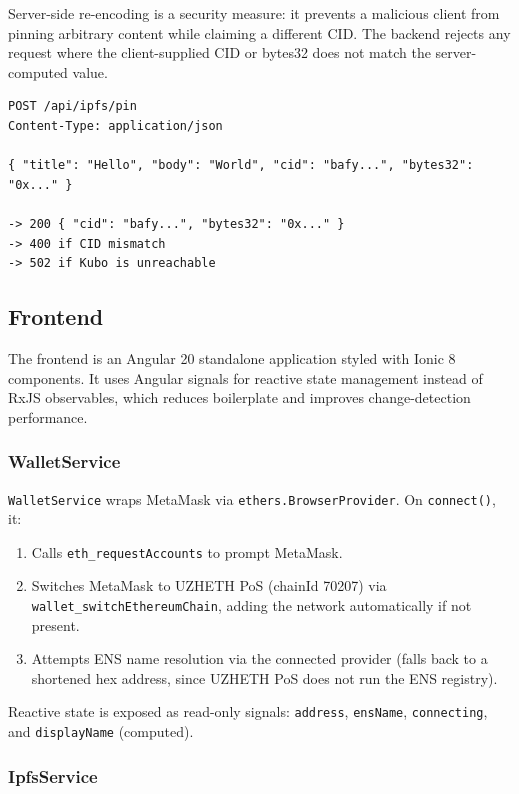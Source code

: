\documentclass[11pt]{article}
\begin{document}
Server-side re-encoding is a security measure: it prevents a malicious client from pinning arbitrary content while claiming a different CID. The backend rejects any request where the client-supplied CID or bytes32 does not match the server-computed value.

\begin{lstlisting}[style=command]
POST /api/ipfs/pin
Content-Type: application/json

{ "title": "Hello", "body": "World", "cid": "bafy...", "bytes32": "0x..." }

-> 200 { "cid": "bafy...", "bytes32": "0x..." }
-> 400 if CID mismatch
-> 502 if Kubo is unreachable
\end{lstlisting}

\subsection{Frontend}

The frontend is an Angular 20 standalone application styled with Ionic 8 components. It uses Angular signals for reactive state management instead of RxJS observables, which reduces boilerplate and improves change-detection performance.

\subsubsection{WalletService}

\texttt{WalletService} wraps MetaMask via \texttt{ethers.BrowserProvider}. On \texttt{connect()}, it:
\begin{enumerate}
  \item Calls \texttt{eth\_requestAccounts} to prompt MetaMask.
  \item Switches MetaMask to UZHETH PoS (chainId 70207) via \texttt{wallet\_switchEthereumChain}, adding the network automatically if not present.
  \item Attempts ENS name resolution via the connected provider (falls back to a shortened hex address, since UZHETH PoS does not run the ENS registry).
\end{enumerate}

Reactive state is exposed as read-only signals: \texttt{address}, \texttt{ensName}, \texttt{connecting}, and \texttt{displayName} (computed).

\subsubsection{IpfsService}
\end{document}
